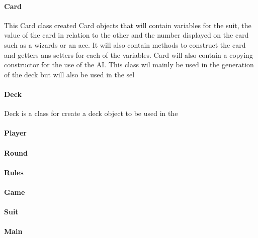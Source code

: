 \paragraph{Card}
This Card class created Card objects that will contain variables for the suit, the value of the card in relation to the other and the number displayed on the card such as a wizards or an ace. It will also contain methods to construct the card and getters ans setters for each of the variables. Card will also contain a copying constructor for the use of the AI. This class wil mainly be used in the generation of the deck but will also be used in the sel
\paragraph{Deck}
Deck is a class for create a deck object to be used in the 
\paragraph{Player}
\paragraph{Round}
\paragraph{Rules}
\paragraph{Game}
\paragraph{Suit}
\paragraph{Main}
